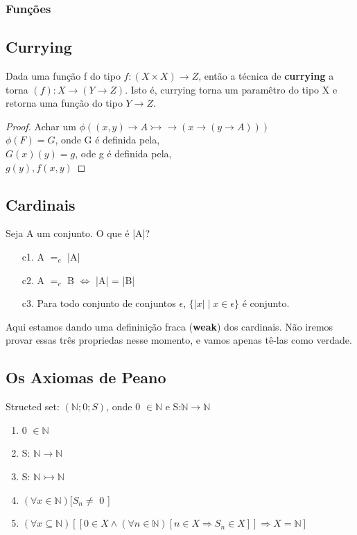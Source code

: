 \documentclass[12pt, a4paper]{article}
\begin{document}
			\subsubsection{Fun\c{c}\~oes}
		
		\subsection{Currying}
			Dada uma fun\c{c}\~ao f do tipo $f:(X \times X) \rightarrow Z$, ent\~ao a t\'ecnica de \textbf{currying} a torna $(f): X \rightarrow (Y \rightarrow Z)$.
			Isto \'e, currying torna um param\^etro do tipo X e retorna uma fun\c{c}\~ao do tipo $Y \rightarrow Z$.

			\begin{proof}
			Achar um $\phi ( (x,y) \rightarrow A \rightarrowtail\!\!\!\!\!\rightarrow (x \rightarrow (y \rightarrow A)))$\\
			$\phi(F) = G$, onde G \'e definida pela,\\
			$G(x)(y) = g$, ode g \'e definida pela,\\
			$g(y), f(x,y)$
			\end{proof} 
		
		\subsection{Cardinais}
			Seja A um conjunto. O que \'e |A|?
			\begin{itemize}
			\item[c1.] A $=_c$ |A|
			\item[c2.] A $=_c$ B $\Leftrightarrow$ |A| = |B|
			\item[c3.] Para todo conjunto de conjuntos $\epsilon$,
						$\{|x| \mid x \in \epsilon \}$ \'e conjunto.
			\end{itemize}

			Aqui estamos dando uma definini\c{c}\~ao fraca (\textbf{weak}) dos cardinais. N\~ao iremos provar essas tr\^es propriedas nesse momento, e vamos apenas t\^e-las como verdade.

		\subsection{Os Axiomas de Peano}
			Structed set: $(\mathbb{N}; 0; S)$, onde 0 $\in \mathbb{N}$ e S:$\mathbb{N} \rightarrow \mathbb{N}$\\

			\begin{enumerate}
			\item 0 $\in \mathbb{N}$
			\item S: $\mathbb{N} \rightarrow \mathbb{N}$
			\item S: $\mathbb{N} \rightarrowtail \mathbb{N}$
			\item $(\forall x \in \mathbb{N})[S_n \neq$ 0 ]
			\item $(\forall x \subseteq \mathbb{N})[ [0 \in X \land (\forall n \in \mathbb{N}) [n \in X \Rightarrow S_n \in X ]] \Rightarrow X = \mathbb{N}]$
			\end{enumerate}
\end{document}
